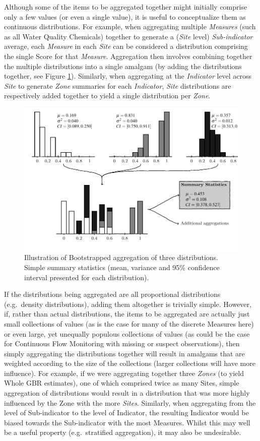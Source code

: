 Although some of the items to be aggregated together might initially comprise only a few values (or
even a single value), it is useful to conceptualize them as continuous distributions. For example,
when aggregating multiple \emph{Measures} (such as all Water Quality Chemicals) together to generate
a (\emph{Site} level) \emph{Sub-indicator} average, each \emph{Measure} in each \emph{Site} can be
considered a distribution comprising the single Score for that \emph{Measure}. Aggregation then
involves combining together the multiple distributions into a single amalgam (by adding the
distributions together, see Figure \ref{fig:bootstrap}). Similarly, when aggregating at the
\emph{Indicator} level across \emph{Site} to generate \emph{Zone} summaries for each
\emph{Indicator}, \emph{Site} distributions are respectively added together to yield a single
distribution per \emph{Zone}.

\begin{figure}[h]
\centering
\includegraphics[width=0.7\linewidth]{figures/Diagrams/bootstrap.pdf}
\caption[Bootstrap aggregation schematic]{Illustration of Bootstrapped aggregation of three distributions.  Simple summary statistics (mean, variance and 95\% confidence interval presented for each distribution).}\label{fig:bootstrap}
\end{figure}


If the distributions being aggregated are all proportional distributions (e.g.~density
distributions), adding them altogether is trivially simple. However, if, rather than actual
distributions, the items to be aggregated are actually just small collections of values (as is the
case for many of the discrete Measures here) or even large, yet unequally populous collections of
values (as could be the case for Continuous Flow Monitoring with missing or suspect observations),
then simply aggregating the distributions together will result in amalgams that are weighted
according to the size of the collections (larger collections will have more influence). For example,
if we were aggregating together three \emph{Zones} (to yield Whole GBR estimates), one of which
comprised twice as many Sites, simple aggregation of distributions would result in a distribution
that was more highly influenced by the Zone with the more \emph{Sites}. Similarly, when aggregating
from the level of Sub-indicator to the level of Indicator, the resulting Indicator would be biased
towards the Sub-indicator with the most Measures.  Whilst this may well be a useful property
(e.g.~stratified aggregation), it may also be undesirable.

